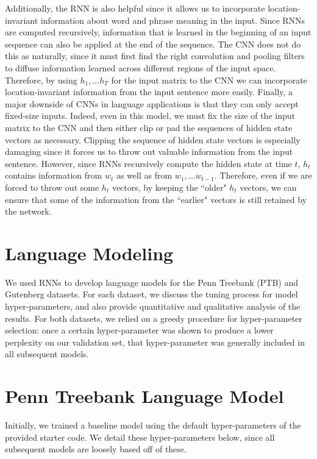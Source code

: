 \documentclass[a4paper]{article}
\begin{document}
\newline
\newline
Additionally, the RNN is also helpful since it allows us to incorporate location-invariant information about word and phrase meaning in the input. Since RNNs are computed recursively, information that is learned in the beginning of an input sequence can also be applied at the end of the sequence. The CNN does not do this as naturally, since it must first find the right convolution and pooling filters to diffuse information learned across different regions of the input space. Therefore, by using $h_1,...h_T$ for the input matrix to the CNN we can incorporate location-invariant information from the input sentence more easily.
\newline
\newline
Finally, a major downside of CNNs in language applications is that they can only accept fixed-size inputs. Indeed, even in this model, we must fix the size of the input matrix to the CNN and then either clip or pad the sequences of hidden state vectors as necessary. Clipping the sequence of hidden state vectors is especially damaging since it forces us to throw out valuable information from the input sentence. However, since RNNs recursively compute the hidden state at time $t$, $h_t$ contains information from $w_t$ as well as from $w_1, ... w_{t-1}$. Therefore, even if we are forced to throw out some $h_t$ vectors, by keeping the ``older" $h_t$ vectors, we can ensure that some of the information from the ``earlier" vectors is still retained by the network. 
\newline
\newline

\section{Language Modeling}

We used RNNs to develop language models for the Penn Treebank (PTB) and Gutenberg datasets. For each dataset, we discuss the tuning process for model hyper-parameters, and also provide quantitative and qualitative analysis of the results. For both datasets, we relied on a greedy procedure for hyper-parameter selection: once a certain hyper-parameter was shown to produce a lower perplexity on our validation set, that hyper-parameter was generally included in all subsequent models. 

\section*{Penn Treebank Language Model}
Initially, we trained a baseline model using the default hyper-parameters of the provided starter code. We detail these hyper-parameters below, since all subsequent models are loosely based off of these. 
\end{document}
